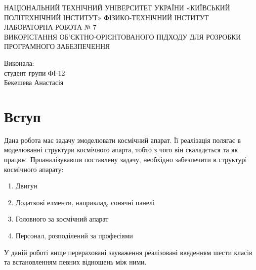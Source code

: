 \documentclass[a4paper,12pt]{article}
\begin{document}
\begin{titlepage}
\begin{center}
\large НАЦІОНАЛЬНИЙ ТЕХНІЧНИЙ УНІВЕРСИТЕТ УКРАЇНИ «КИЇВСЬКИЙ ПОЛІТЕХНІЧНИЙ ІНСТИТУТ» ФІЗИКО-ТЕХНІЧНИЙ ІНСТИТУТ	
\newline\newline\newline\newline\newline\newline\newline\newline\newline
\LARGE{ЛАБОРАТОРНА РОБОТА № 7\\
 ВИКОРІСТАННЯ ОБ'ЄКТНО-ОРІЄНТОВАНОГО ПІДХОДУ ДЛЯ РОЗРОБКИ ПРОГРАМНОГО ЗАБЕЗПЕЧЕННЯ}
\newline\newline\newline\newline\newline\newline\newline\newline\newline
\end{center}
\flushright 
Виконала:\\
студент групи  ФІ-12\\
Бекешева Анастасія \\

\end{titlepage}
\newpage
\tableofcontents
\newpage 
\section{Вступ}
Дана робота має задачу змоделювати космічний апарат. Її реалізація полягає в моделюванні структури космічного апарта, тобто з чого він скаладється та як працює. Проаналізувавши поставлену задачу, необхідно забезпечити в структурі космічного апарату: \begin{enumerate}
	\item Двигун
	\item Додаткові елменти, наприклад, сонячні панелі
	\item Головного за космічний апарат
	\item Персонал, розподілений за професіями
\end{enumerate}
У даній  роботі вище перераховані зауваження реалізовані введенням шести класів та встановленням певних відношень між ними.
\newpage
\end{document}
